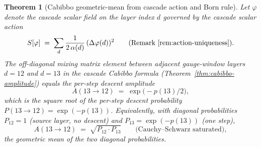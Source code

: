 \documentclass[12pt,a4paper]{article}
\newtheorem{theorem}{Theorem}[section]
\begin{document}
\begin{theorem}[Cabibbo geometric-mean from cascade action and Born rule]\label{thm:cabibbo-geometric-mean}
Let $\varphi$ denote the cascade scalar field on the layer index $d$
governed by the cascade scalar action
\[
S[\varphi] \;=\; \sum_d \frac{1}{2\,\alpha(d)}\,(\Delta\varphi(d))^2
\qquad
\text{(Remark~\ref{rem:action-uniqueness})}.
\]
The off-diagonal mixing matrix element between adjacent gauge-window
layers $d=12$ and $d=13$ in the cascade Cabibbo formula
(Theorem~\ref{thm:cabibbo-amplitude}) equals the per-step descent
\emph{amplitude}
\[
A(13\to 12) \;=\; \exp\!\bigl(-p(13)/2\bigr),
\]
which is the square root of the per-step descent probability
$P(13\to 12) = \exp(-p(13))$.  Equivalently, with diagonal probabilities
$P_{12}=1$ (source layer, no descent) and $P_{13}=\exp(-p(13))$ (one
step),
\[
A(13\to 12) \;=\; \sqrt{P_{12}\cdot P_{13}}
\qquad
\text{(Cauchy--Schwarz saturated)},
\]
the geometric mean of the two diagonal probabilities.
\end{theorem}
\end{document}
